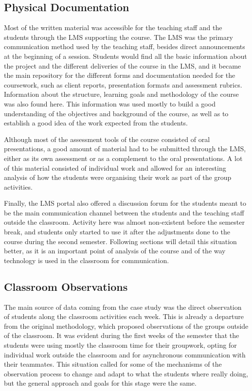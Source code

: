 \subsection{Physical Documentation \label{sec:6-3-1}}

Most of the written material was accessible for the teaching staff and the students through the \ac{LMS} supporting the course. The \ac{LMS} was the primary communication
method used by the teaching staff, besides direct announcements at the beginning of a session. Students would find all the basic information about the project and the
different deliveries of the course in the \ac{LMS}, and it became the main repository for the different forms and documentation needed for the coursework, such as client
reports, presentation formats and assessment rubrics. Information about the structure, learning goals and methodology of the course was also found here. This information
was used mostly to build a good understanding of the objectives and background of the course, as well as to establish a good idea of the work expected from the students.

Although most of the assessment tools of the course consisted of oral presentations, a good amount of material had to be submitted through the LMS, either as its own
assessment or as a complement to the oral presentations. A lot of this material consisted of individual work and allowed for an interesting analysis of how the students
were organising their work as part of the group activities.

Finally, the \ac{LMS} portal also offered a discussion forum for the students meant to be the main communication channel between the students and the teaching staff
outside the classroom. Activity here was almost non-existent before the semester break, and students only started to use it after the adjustments done to the course during
the second semester. Following sections will detail this situation better, as it is an important point of analysis of the course and of the way technology is used in the
classroom for communication.

\subsection{Classroom Observations \label{sec:6-3-2}}

The main source of data coming from the case study was the direct observation of students along the classroom activities each week. This is already a departure from the
original methodology, which proposed observations of the groups outside of the classroom. It was evident during the first weeks of the semester that the students were
using mostly the classroom time for their groupwork, opting for individual work outside the classroom and for asynchronous communication with their teammates. This
situation called for some of the mechanisms of the observation process to change and adapt to what the students where really doing, but the general approach and goals for
this stage were the same.

